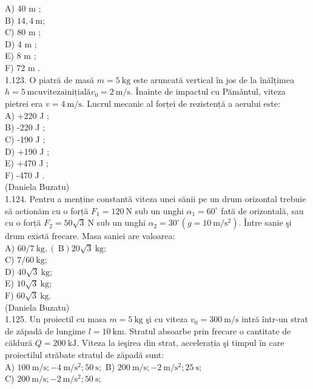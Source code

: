 \documentclass[10pt]{article}
\begin{document}
A) 40 m ;\\
B) $14,4 \mathrm{~m}$;\\
C) 80 m ;\\
D) 4 m ;\\
E) 8 m ;\\
F) 72 m .\\
1.123. O piatră de masă $m=5 \mathrm{~kg}$ este aruncată vertical în jos de la înălțimea $h=5 \mathrm{~m} \mathrm{cu} \mathrm{viteza} \mathrm{inițială} v_{0}=2 \mathrm{~m} / \mathrm{s}$. Înainte de impactul cu Pământul, viteza pietrei era $v=4 \mathrm{~m} / \mathrm{s}$. Lucrul mecanic al forței de rezistență a aerului este:\\
A) +220 J ;\\
B) -220 J ;\\
C) -190 J ;\\
D) +190 J ;\\
E) +470 J ;\\
F) -470 J .\\
(Daniela Buzatu)\\
1.124. Pentru a menține constantă viteza unei sănii pe un drum orizontal trebuie să actionăm cu o forță $F_{1}=120 \mathrm{~N}$ sub un unghi $\alpha_{1}=60^{\circ}$ fată de orizontală, sau cu o forță $F_{2}=50 \sqrt{3} \mathrm{~N}$ sub un unghi $\alpha_{2}=30^{\circ}\left(g=10 \mathrm{~m} / \mathrm{s}^{2}\right)$. Între sanie şi drum există frecare. Masa saniei are valoarea:\\
A) $60 / 7 \mathrm{~kg},(\mathrm{~B}) 20 \sqrt{3} \mathrm{~kg}$;\\
C) $7 / 60 \mathrm{~kg}$;\\
D) $40 \sqrt{3} \mathrm{~kg}$;\\
E) $10 \sqrt{3} \mathrm{~kg}$;\\
F) $60 \sqrt{3} \mathrm{~kg}$.\\
(Daniela Buzatu)\\
1.125. Un proiectil cu masa $m=5 \mathrm{~kg}$ şi cu viteza $v_{0}=300 \mathrm{~m} / \mathrm{s}$ intră într-un strat de zăpadă de lungime $l=10 \mathrm{~km}$. Stratul absoarbe prin frecare o cantitate de căldură $Q=200 \mathrm{~kJ}$. Viteza la ieşirea din strat, accelerația şi timpul în care proiectilul străbate stratul de zăpadă sunt:\\
A) $100 \mathrm{~m} / \mathrm{s} ;-4 \mathrm{~m} / \mathrm{s}^{2} ; 50 \mathrm{~s} ;$ B) $200 \mathrm{~m} / \mathrm{s} ;-2 \mathrm{~m} / \mathrm{s}^{2} ; 25 \mathrm{~s}$;\\
C) $200 \mathrm{~m} / \mathrm{s} ;-2 \mathrm{~m} / \mathrm{s}^{2} ; 50 \mathrm{~s}$;\\
\end{document}
